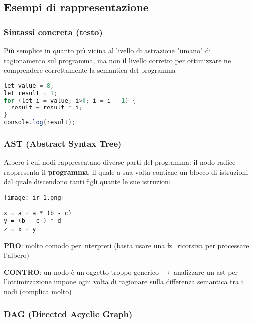 \subsection{Esempi di rappresentazione}


\subsubsection{Sintassi concreta (testo)}

Pi\`u semplice in quanto pi\`u vicina al livello di astrazione "umano" di ragionamento sul programma, ma non il livello corretto per ottimizzare ne comprendere correttamente la semantica del programma

\begin{lstlisting}[language=java]
let value = 8;
let result = 1;
for (let i = value; i>0; i = i - 1) {
  result = result * i;
}
console.log(result);\end{lstlisting}

\vspace{-.5em}
\subsubsection{AST (Abstract Syntax Tree)}

Albero i cui nodi rappresentano diverse parti del programma: il nodo radice rappresenta il \textbf{programma}, il quale a sua volta contiene un blocco di istruzioni dal quale discendono tanti figli quante le sue istruzioni

\vspace{1em}
\noindent\begin{minipage}[c]{.3\textwidth}
  \texttt{[image: ir\_1.png]}
\end{minipage}\hfill
\begin{minipage}[c]{.67\textwidth}
\begin{lstlisting}[linewidth=.5\linewidth]
x = a + a * (b - c)
y = (b - c ) * d
z = x + y\end{lstlisting}
\textbf{PRO}: molto comodo per interpreti (basta usare una fz.~ricorsiva per processare l'albero)

\textbf{CONTRO}: un nodo \`e un oggetto troppo generico $\rightarrow$ analizzare un ast per l'ottimizzazione impone ogni volta di ragionare sulla differenza semantica tra i nodi (complica molto)
\end{minipage}


\vspace{-.5em}
\subsubsection{DAG (Directed Acyclic Graph)}

